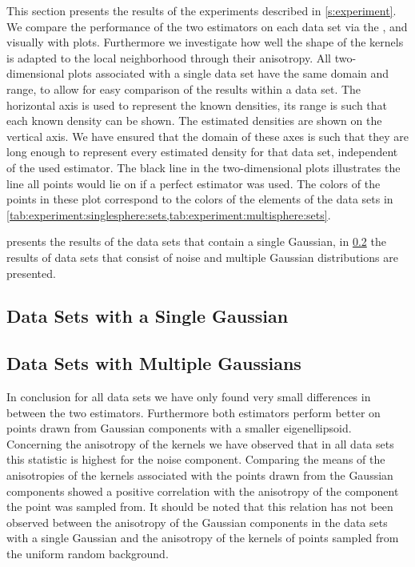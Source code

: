 
This section presents the results of the experiments described in \cref{s:experiment}. 
We compare the performance of the two estimators on each data set via the \mse,  and visually with plots. Furthermore we investigate how well the shape of the kernels is adapted to the local neighborhood through their anisotropy.
	All two-dimensional plots associated with a single data set have the same domain and range, to allow for easy comparison of the results within a data set. The horizontal axis is used to represent the known densities, its range is such that each known density can be shown. The estimated densities are shown on the vertical axis. We have ensured that the domain of these axes is such that they are long enough to represent every estimated density for that data set, independent of the used estimator. 
	The black line in the two-dimensional plots illustrates the line all points would lie on if a perfect estimator was used.
	The colors of the points in these plot correspond to the colors of the elements of the data sets in \cref{tab:experiment:singlesphere:sets,tab:experiment:multisphere:sets}.

	 presents the results of the data sets that contain a single Gaussian, in \cref{s:results:multipleGaussian} the results of data sets that consist of noise and multiple Gaussian distributions are presented. 

\subsection{Data Sets with a Single Gaussian}
\label{s:results:singleGaussian}


\subsection{Data Sets with Multiple Gaussians}
\label{s:results:multipleGaussian}


	In conclusion for all data sets we have only found very small differences in \mse between the two estimators. 
	Furthermore both estimators perform better on points drawn from Gaussian components with a smaller eigenellipsoid. 
	Concerning the anisotropy of the kernels we have observed that in all data sets this statistic is highest for the noise component. 
	Comparing the means of the anisotropies of the kernels associated with the points drawn from the Gaussian components showed a positive correlation with the anisotropy of the component the point was sampled from. It should be noted that this relation has not been observed between the anisotropy of the Gaussian components in the data sets with a single Gaussian and the anisotropy of the kernels of points sampled from the uniform random background.